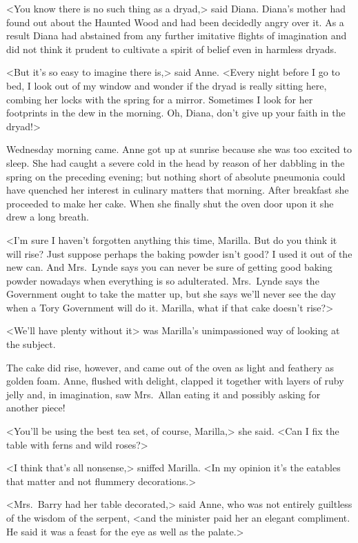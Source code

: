 <You know there is no such thing as a dryad,> said Diana. Diana's mother had found out about the Haunted Wood and had been decidedly angry over it. As a result Diana had abstained from any further imitative flights of imagination and did not think it prudent to cultivate a spirit of belief even in harmless dryads.

<But it's so easy to imagine there is,> said Anne. <Every night before I go to bed, I look out of my window and wonder if the dryad is really sitting here, combing her locks with the spring for a mirror. Sometimes I look for her footprints in the dew in the morning. Oh, Diana, don't give up your faith in the dryad!>

Wednesday morning came. Anne got up at sunrise because she was too excited to sleep. She had caught a severe cold in the head by reason of her dabbling in the spring on the preceding evening; but nothing short of absolute pneumonia could have quenched her interest in culinary matters that morning. After breakfast she proceeded to make her cake. When she finally shut the oven door upon it she drew a long breath.

<I'm sure I haven't forgotten anything this time, Marilla. But do you think it will rise? Just suppose perhaps the baking powder isn't good? I used it out of the new can. And Mrs.~Lynde says you can never be sure of getting good baking powder nowadays when everything is so adulterated. Mrs.~Lynde says the Government ought to take the matter up, but she says we'll never see the day when a Tory Government will do it. Marilla, what if that cake doesn't rise?>

<We'll have plenty without it> was Marilla's unimpassioned way of looking at the subject.

The cake did rise, however, and came out of the oven as light and feathery as golden foam. Anne, flushed with delight, clapped it together with layers of ruby jelly and, in imagination, saw Mrs.~Allan eating it and possibly asking for another piece!

<You'll be using the best tea set, of course, Marilla,> she said. <Can I fix the table with ferns and wild roses?>

<I think that's all nonsense,> sniffed Marilla. <In my opinion it's the eatables that matter and not flummery decorations.>

<Mrs.~Barry had her table decorated,> said Anne, who was not entirely guiltless of the wisdom of the serpent, <and the minister paid her an elegant compliment. He said it was a feast for the eye as well as the palate.>

